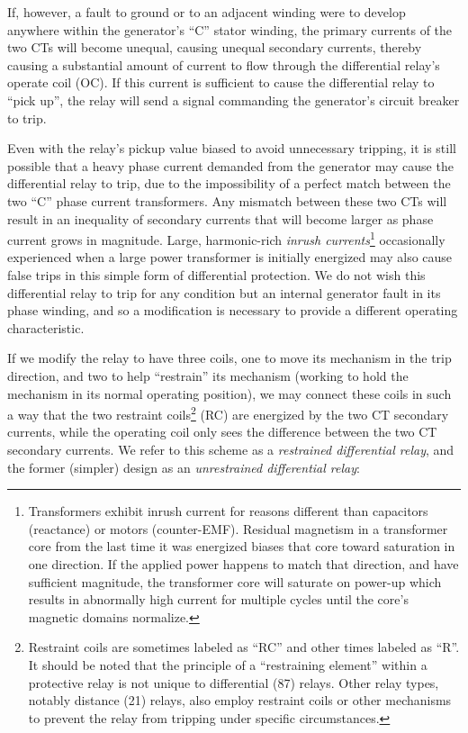 If, however, a fault to ground or to an adjacent winding were to develop anywhere within the generator's ``C'' stator winding, the primary currents of the two CTs will become unequal, causing unequal secondary currents, thereby causing a substantial amount of current to flow through the differential relay's operate coil (OC).  If this current is sufficient to cause the differential relay to ``pick up'', the relay will send a signal commanding the generator's circuit breaker to trip.

\vskip 10pt

\filbreak

Even with the relay's pickup value biased to avoid unnecessary tripping, it is still possible that a heavy phase current demanded from the generator may cause the differential relay to trip, due to the impossibility of a perfect match between the two ``C'' phase current transformers.  Any mismatch between these two CTs will result in an inequality of secondary currents that will become larger as phase current grows in magnitude.  Large, harmonic-rich \textit{inrush currents}\footnote{Transformers exhibit inrush current for reasons different than capacitors (reactance) or motors (counter-EMF).  Residual magnetism in a transformer core from the last time it was energized biases that core toward saturation in one direction.  If the applied power happens to match that direction, and have sufficient magnitude, the transformer core will saturate on power-up which results in abnormally high current for multiple cycles until the core's magnetic domains normalize.} occasionally experienced when a large power transformer is initially energized may also cause false trips in this simple form of differential protection.  We do not wish this differential relay to trip for any condition but an internal generator fault in its phase winding, and so a modification is necessary to provide a different operating characteristic.

If we modify the relay to have three coils, one to move its mechanism in the trip direction, and two to help ``restrain'' its mechanism (working to hold the mechanism in its normal operating position), we may connect these coils in such a way that the two restraint coils\footnote{Restraint coils are sometimes labeled as ``RC'' and other times labeled as ``R''.  It should be noted that the principle of a ``restraining element'' within a protective relay is not unique to differential (87) relays.  Other relay types, notably distance (21) relays, also employ restraint coils or other mechanisms to prevent the relay from tripping under specific circumstances.} (RC) are energized by the two CT secondary currents, while the operating coil only sees the difference between the two CT secondary currents.  We refer to this scheme as a \textit{restrained differential relay}, and the former (simpler) design as an \textit{unrestrained differential relay}:      

